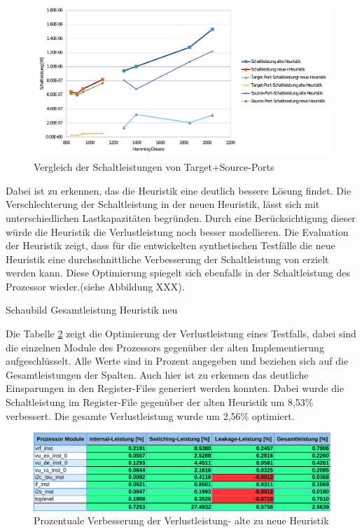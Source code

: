 \begin{figure}[H]
	\centering
	\includegraphics[width=\textwidth]{fig/heuristik_schaltleistung_alt_neu.pdf}
	\caption{Vergleich der Schaltleistungen von Target+Source-Ports}
	\label{fig:heuristic_schaltleistung_alt_neu}
\end{figure}

Dabei ist zu erkennen, das die Heuristik eine deutlich bessere Lösung findet. Die Verschlechterung der Schaltleistung in der neuen Heuristik, lässt sich mit unterschiedlichen Lastkapazitäten begründen. Durch eine Berücksichtigung dieser würde die Heuristik die Verlustleistung noch besser modellieren. 
Die Evaluation der Heuristik zeigt, dass für die entwickelten synthetischen Testfälle die neue Heuristik eine durchschnittliche Verbesserung der Schaltleistung von  erzielt werden kann. Diese Optimierung spiegelt sich ebenfalls in der Schaltleistung des Prozessor wieder.(siehe Abbildung XXX).

 Schaubild Gesamtleistung Heuristik neu

Die Tabelle \ref{fig:compare_power_heuristic} zeigt die Optimierung der Verlustleistung eines Testfalls, dabei sind die einzelnen Module des Prozessors gegenüber der alten Implementierung aufgeschlüsselt. Alle Werte sind in Prozent angegeben und beziehen sich auf die Gesamtleistungen der Spalten. Auch hier ist zu erkennen das deutliche Einsparungen in den Register-Files generiert werden konnten. Dabei wurde die Schaltleistung im Register-File gegenüber der alten Heuristik um 8,53\% verbessert. Die gesamte Verlustleistung wurde um 2,56\% optimiert. 

\begin{figure}[H]
	\centering
	\includegraphics[width=\textwidth]{fig/compare_power_heuristic.pdf}
	\caption{Prozentuale Verbesserung der Verlustleistung- alte zu neue Heuristik}
	\label{fig:compare_power_heuristic}
\end{figure}


